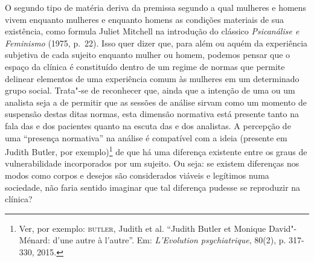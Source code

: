 O segundo tipo de matéria deriva da premissa segundo a qual mulheres e
homens vivem enquanto mulheres e enquanto homens as condições materiais
de sua existência, como formula Juliet Mitchell na introdução do
clássico \emph{Psicanálise e Feminismo} (1975, p.~22). Isso quer dizer que, para além ou aquém da
experiência subjetiva de cada sujeito enquanto mulher ou homem, podemos
pensar que o espaço da clínica é constituído dentro de um regime de
normas que permite delinear elementos de uma experiência comum às
mulheres em um determinado grupo social. Trata"-se de reconhecer que,
ainda que a intenção de uma ou um analista seja a de permitir que as
sessões de análise sirvam como um momento de suspensão destas ditas
normas, esta dimensão normativa está presente tanto na fala das e dos
pacientes quanto na escuta das e dos analistas. A percepção de uma
``presença normativa'' na análise é compatível com a ideia (presente em
Judith Butler, por exemplo)\footnote{Ver, por exemplo: \textsc{butler}, Judith et al.
 ``Judith Butler et Monique David"-Ménard: d'une autre à
  l'autre''. Em: \emph{L'Evolution psychiatrique}, 80(2), p. 317-330, 2015.} de
que há uma diferença existente entre os graus de vulnerabilidade
incorporados por um sujeito. Ou seja: se existem diferenças nos modos
como corpos e desejos são considerados viáveis e legítimos numa
sociedade, não faria sentido imaginar que tal diferença pudesse se
reproduzir na clínica?

